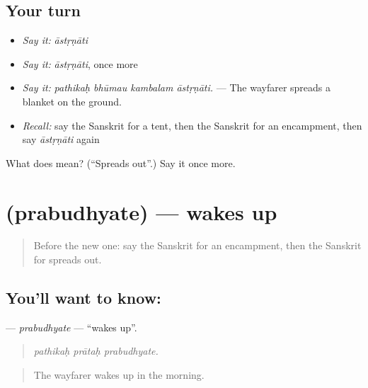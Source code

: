 \subsection*{Your turn}
\begin{itemize}
\raggedright
  \item \emph{Say it:} \emph{āstṛṇāti}
  \item \emph{Say it:} \emph{āstṛṇāti}, once more
  \item \emph{Say it:} \emph{pathikaḥ bhūmau kambalam āstṛṇāti.} — The wayfarer spreads a blanket on the ground.
  \item \emph{Recall:} say the Sanskrit for a tent, then the Sanskrit for an encampment, then say \emph{āstṛṇāti} again
\end{itemize}

\begin{tcolorbox}[breakable,colback=teal!4,colframe=teal!35!black,title={Before you move on}]
What does  mean? (\textquotedblleft{}Spreads out\textquotedblright{}.) Say it once more.
\end{tcolorbox}
\section[\texorpdfstring{\sk{प्रबुध्यते} (prabudhyate)}{प्रबुध्यते (prabudhyate)}]{ (prabudhyate) — wakes up}

\label{lesson:SA-C427-prabudhyate}



\begin{quote}
Before the new one: say the Sanskrit for an encampment, then the Sanskrit for spreads out.
\end{quote}

\subsection*{You'll want to know: }
\textbf{} — \emph{prabudhyate} — \textquotedblleft{}wakes up\textquotedblright{}.

\begin{quote}
  
\end{quote}

\begin{quote}
\emph{pathikaḥ prātaḥ prabudhyate.}
\end{quote}

\begin{quote}
The wayfarer wakes up in the morning.
\end{quote}

